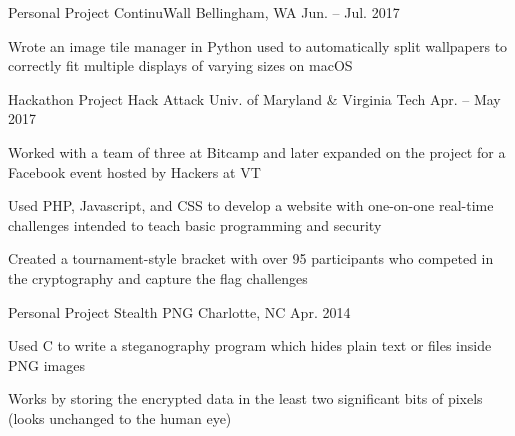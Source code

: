 

\begin{cventries}

  \cventry
    {Personal Project} %
    {ContinuWall} %
    {Bellingham, WA} %
    {Jun. – Jul. 2017} %
    {
      \begin{cvitems} %
      \item {Wrote an image tile manager in Python used to automatically split wallpapers to correctly fit multiple displays of varying sizes on macOS}
      \end{cvitems}
    }

  \cventry
    {Hackathon Project} %
    {Hack Attack} %
    {Univ. of Maryland \& Virginia Tech} %
    {Apr. – May 2017} %
    {
      \begin{cvitems} %
      \item {Worked with a team of three at Bitcamp and later expanded on the project for a Facebook event hosted by Hackers at VT}
      \item {Used PHP, Javascript, and CSS to develop a website with one-on-one real-time challenges intended to teach basic programming and security}
      \item {Created a tournament-style bracket with over 95 participants who competed in the cryptography and capture the flag challenges}
      \end{cvitems}
    }

  \cventry
    {Personal Project} %
    {Stealth PNG} %
    {Charlotte, NC} %
    {Apr. 2014} %
    {
      \begin{cvitems} %
      \item {Used C to write a steganography program which hides plain text or files inside PNG images}
      \item {Works by storing the encrypted data in the least two significant bits of pixels (looks unchanged to the human eye)}
      \end{cvitems}
    }

\end{cventries}
